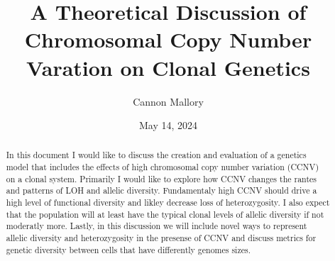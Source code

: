 \documentclass{article}
\title{A Theoretical Discussion of Chromosomal Copy Number Varation on Clonal Genetics}
\author{Cannon Mallory}
\date{May 14, 2024}
\begin{document}
    \maketitle

    \begin{abstract}
        In this document I would like to discuss the creation and evaluation of a genetics model that includes the effects of high chromosomal copy number variation (CCNV) on a clonal system.  Primarily I would like to explore how CCNV changes the rantes and patterns of LOH and allelic diversity.  Fundamentaly high CCNV should drive a high level of functional diversity and likley decrease loss of heterozygosity.  I also expect that the population will at least have the typical clonal levels of allelic diversity if not moderatly more.  Lastly, in this discussion we will include novel ways to represent allelic diversity and heterozygosity in the presense of CCNV and discuss metrics for genetic diversity between cells that have differently genomes sizes.\bigskip


\end{abstract}
\end{document}
